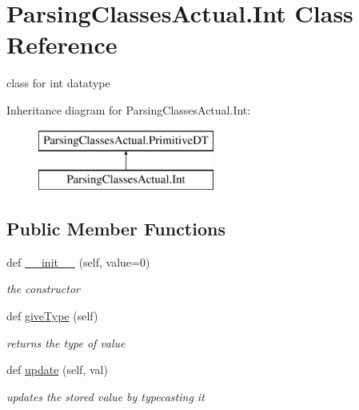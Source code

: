 \hypertarget{class_parsing_classes_actual_1_1_int}{}\section{Parsing\+Classes\+Actual.\+Int Class Reference}
\label{class_parsing_classes_actual_1_1_int}


class for int datatype  


Inheritance diagram for Parsing\+Classes\+Actual.\+Int\+:\begin{figure}[H]
\begin{center}
\leavevmode
\includegraphics[height=2.000000cm]{class_parsing_classes_actual_1_1_int}
\end{center}
\end{figure}
\subsection*{Public Member Functions}
\begin{DoxyCompactItemize}
\item 
def \hyperlink{class_parsing_classes_actual_1_1_int_a138d3ed5b3b5bcc5f3aeeef5716a1c42}{\+\_\+\+\_\+init\+\_\+\+\_\+} (self, value=0)
\begin{DoxyCompactList}\small\item\em the constructor \end{DoxyCompactList}\item 
\mbox{\label{class_parsing_classes_actual_1_1_int_a6430fbdf4a89ea8c64b08c5d69c3ac1a}} 
def \hyperlink{class_parsing_classes_actual_1_1_int_a6430fbdf4a89ea8c64b08c5d69c3ac1a}{give\+Type} (self)
\begin{DoxyCompactList}\small\item\em returns the type of value \end{DoxyCompactList}\item 
\mbox{\label{class_parsing_classes_actual_1_1_int_a9dd15ae2f1ef3e3452d307013b439744}} 
def \hyperlink{class_parsing_classes_actual_1_1_int_a9dd15ae2f1ef3e3452d307013b439744}{update} (self, val)
\begin{DoxyCompactList}\small\item\em updates the stored value by typecasting it \end{DoxyCompactList}\end{DoxyCompactItemize}
